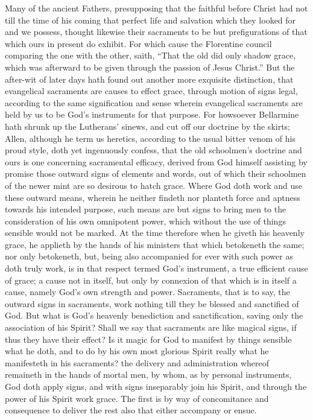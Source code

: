 Many of the ancient Fathers, presupposing that the faithful before Christ had not till the time of his coming that perfect life and salvation which they looked for and we possess, thought likewise their sacraments to be but prefigurations of that which ours in present do exhibit. For which cause the Florentine council comparing the one with the other, saith, “That the old did only shadow grace, which was afterward to be given through the passion of Jesus Christ.” But the after-wit of later days hath found out another more exquisite distinction, that evangelical sacraments are causes to effect grace, through motion of signs legal, according to the same signification and sense wherein evangelical sacraments are held by us to be God’s instruments for that purpose. For howsoever Bellarmine hath shrunk up the Lutherans’ sinews, and cut off our doctrine by the skirts; Allen, although he term us heretics, according to the usual bitter venom of his proud style, doth yet ingenuously confess, that the old schoolmen’s doctrine and ours is one concerning sacramental efficacy, derived from God himself assisting by promise those outward signs of elements and words, out of which their schoolmen of the newer mint are so desirous to hatch grace. Where God doth work and use these outward means, wherein he neither findeth nor planteth force and aptness towards his intended purpose, such means are but signs to bring men to  the consideration of his own omnipotent power, which without the use of things sensible would not be marked. At the time therefore when he giveth his heavenly grace, he applieth by the hands of his ministers that which betokeneth the same; nor only betokeneth, but, being also accompanied for ever with such power as doth truly work, is in that respect termed God’s instrument, a true efficient cause of grace; a cause not in itself, but only by connexion of that which is in itself a cause, namely God’s own strength and power. Sacraments, that is to say, the outward signs in sacraments, work nothing till they be blessed and sanctified of God. But what is God’s heavenly benediction and sanctification, saving only the association of his Spirit? Shall we say that sacraments are like magical signs, if thus they have their effect? Is it magic for God to manifest by things sensible what he doth, and to do by his own most glorious Spirit really what he manifesteth in his sacraments? the delivery and administration whereof remaineth in the hands of mortal men, by whom, as by personal instruments, God doth apply signs, and with signs inseparably join his Spirit, and through the power of his Spirit work grace. The first is by way of concomitance and consequence to deliver the rest also that either accompany or ensue.

